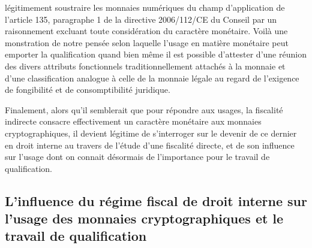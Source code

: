 {légitimement soustraire les monnaies numériques du champ d'application de l'article 135, paragraphe 1 de la directive 2006/112/CE du Conseil par un raisonnement excluant toute considération du caractère monétaire. Voilà une monstration de notre pensée selon laquelle l'usage en matière monétaire peut emporter la qualification quand bien même il est possible d'attester d'une réunion des divers attributs  fonctionnels traditionnellement attachés à la monnaie et d'une classification analogue à celle de la monnaie légale au regard de l'exigence de fongibilité et de consomptibilité juridique.\par
Finalement, alors qu'il semblerait que pour répondre aux usages, la fiscalité indirecte consacre effectivement un caractère monétaire aux monnaies cryptographiques, il devient légitime de s'interroger sur le devenir de ce dernier en droit interne au travers de l'étude d'une fiscalité directe, et de son influence sur l'usage dont on connait désormais de l'importance pour le travail de qualification.\par

\subsection{L'influence du régime fiscal de droit interne sur l'usage des monnaies cryptographiques et le travail de qualification}

}
